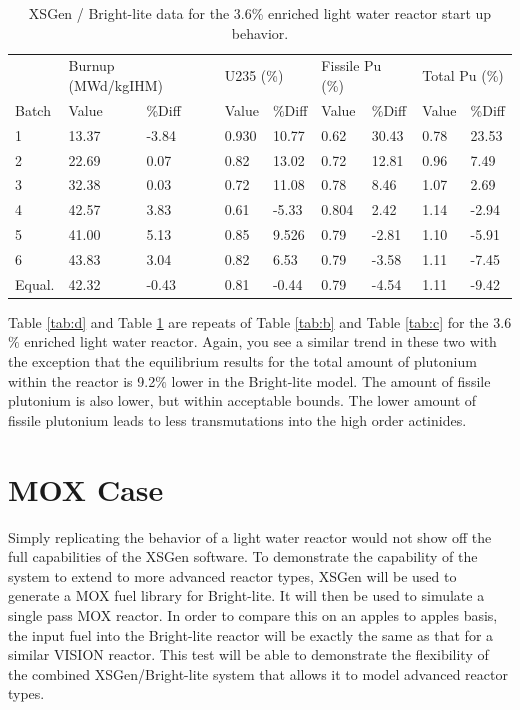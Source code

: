 \documentclass{article}
\begin{document}
\begin{table}[!htb]
\centering
\caption{XSGen / Bright-lite data for the 3.6\% enriched light water reactor start up behavior.}
\label{tab:e}
\begin{tabular}{lllllllll}
 & \multicolumn{2}{l}{Burnup (MWd/kgIHM)} & \multicolumn{2}{l}{U235 (\%)} & \multicolumn{2}{l}{Fissile Pu (\%)} & \multicolumn{2}{l}{Total Pu (\%)} \\
Batch & Value & \%Diff & Value & \%Diff & Value & \%Diff & Value & \%Diff \\
1 & 13.37 & -3.84 & 0.930 & 10.77 & 0.62 & 30.43 & 0.78 & 23.53 \\
2 & 22.69 & 0.07 & 0.82 & 13.02 & 0.72 & 12.81 & 0.96 & 7.49 \\
3 & 32.38 & 0.03 & 0.72 & 11.08 & 0.78 & 8.46 & 1.07 & 2.69 \\
4 & 42.57 & 3.83 & 0.61 & -5.33 & 0.804 & 2.42 & 1.14 & -2.94 \\
5 & 41.00 & 5.13 & 0.85 & 9.526 & 0.79 & -2.81 & 1.10 & -5.91 \\
6 & 43.83 & 3.04 & 0.82 & 6.53 & 0.79 & -3.58 & 1.11 & -7.45 \\
Equal. & 42.32 & -0.43 & 0.81 & -0.44 & 0.79 & -4.54 & 1.11 & -9.42
\end{tabular}
\end{table}

Table \ref{tab:d} and Table \ref{tab:e} are repeats of Table \ref{tab:b} and Table \ref{tab:c} for the 3.6$\%$ enriched light water reactor. Again, you see a similar trend in these two with the exception that the equilibrium results for the total amount of plutonium within the reactor is 9.2$\%$ lower in the Bright-lite model. The amount of fissile plutonium is also lower, but within acceptable bounds. The lower amount of fissile plutonium leads to less transmutations into the high order actinides. 

\section{MOX Case}
Simply replicating the behavior of a light water reactor would not show off the full capabilities of the XSGen software. To demonstrate the capability of the system to extend to more advanced reactor types, XSGen will be used to generate a MOX fuel library for Bright-lite. It will then be used to simulate a single pass MOX reactor. In order to compare this on an apples to apples basis, the input fuel into the Bright-lite reactor will be exactly the same as that for a similar VISION reactor. This test will be able to demonstrate the flexibility of the combined XSGen/Bright-lite system that allows it to model advanced reactor types. 
\end{document}
